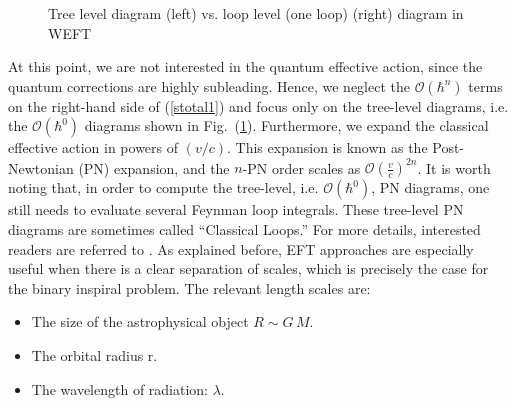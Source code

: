 \par
 \begin{figure}
     \centering
     \caption{Tree level diagram (left) vs. loop level (one loop) (right) diagram in WEFT}
     \label{mfig}
 \end{figure}
At this point, we are not interested in the quantum effective action, since the quantum corrections are highly subleading. Hence, we neglect the $\mathcal{O}(\hbar^n)$ terms on the right-hand side of (\ref{stotal1}) and focus only on the tree-level diagrams, i.e. the $\mathcal{O}(\hbar^0)$ diagrams shown in Fig.~(\ref{mfig}). Furthermore, we expand the classical effective action in powers of $(v/c)$. This expansion is known as the Post-Newtonian (PN) expansion, and the $n$-PN order scales as $\mathcal{O}(\frac{v}{c})^{2n}$. It is worth noting that, in order to compute the tree-level, i.e. $\mathcal{O}(\hbar^0)$, PN diagrams, one still needs to evaluate several Feynman loop integrals. These tree-level PN diagrams are sometimes called ``Classical Loops.'' For more details, interested readers are referred to \cite{Burgess:2020tbq,Porto:2016pyg}. As explained before, EFT approaches are especially useful when there is a clear separation of scales, which is precisely the case for the binary inspiral problem. The relevant length scales are:
\begin{itemize}
    \item The size of the astrophysical object $R\sim G\,M$.
    \item The orbital radius r.
    \item The wavelength of radiation: $\lambda$.
\end{itemize}
